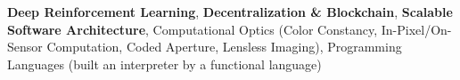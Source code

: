 \textbf{Deep Reinforcement Learning}, \textbf{Decentralization \& Blockchain}, \textbf{Scalable Software Architecture}, Computational Optics (Color Constancy, In-Pixel/On-Sensor Computation, Coded Aperture, Lensless Imaging), Programming Languages (built an interpreter by a functional language)